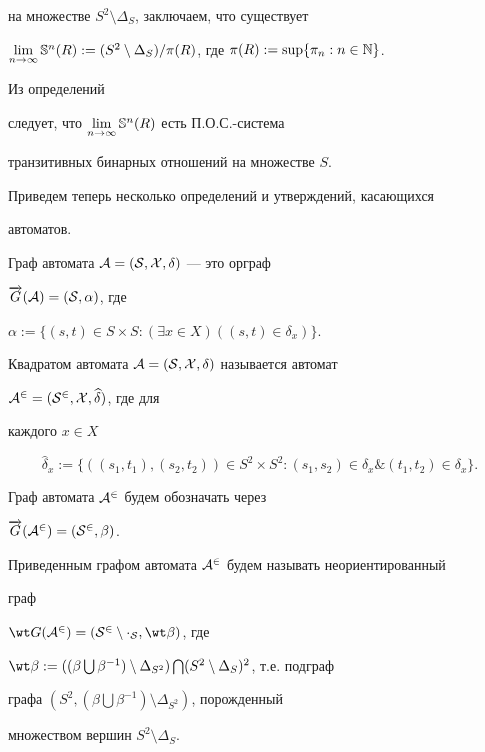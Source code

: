на множестве $S^2\setminus\Delta_S$, заключаем, что существует


$\lim\limits_{n\to\infty}\Bbb S^n(R):=


(S^2\setminus\Delta_S)/\pi(R)$, где $\pi(R):=\sup\{\pi_n:n\in\Bbb N\}$.


Из определений


следует, что $\lim\limits_{n\to\infty}\Bbb S^n(R)$ есть П.О.С.-система


транзитивных бинарных отношений на множестве $S$.





Приведем теперь несколько определений и утверждений, касающихся


автоматов.





Граф автомата $\cal A=(S,X,\delta)$ --- это \cite{Bog} орграф


$\overrightarrow G(\cal A)=(S,\alpha)$, где


$\alpha:=\{(s,t)\in S\times S:(\exists x\in X)((s,t)\in\delta_x)\}$.





Квадратом автомата $\cal A=(S,X,\delta)$ называется автомат


$\cal A^2=(S^2,X,\widehat\delta)$, где для


каждого $x\in X$


$$


\widehat\delta_x:=\{((s_1,t_1),(s_2,t_2))\in S^2\times S^2:


(s_1,s_2)\in\delta_x\&(t_1,t_2)\in\delta_x\}.


$$


Граф автомата $\cal A^2$ будем обозначать через


$\overrightarrow G(\cal A^2)=(S^2,\beta)$.





Приведенным графом автомата $\cal A^2$ будем называть неориентированный


граф


$\wt G(\cal A^2)=(S^2\setminus\Delta_S,\wt\beta)$, где


$\wt\beta:=((\beta\bigcup\beta^{-1})\setminus\Delta_{S^2})


\bigcap(S^2\setminus\Delta_S)^2$, т.е. подграф


графа $(S^2,(\beta\bigcup\beta^{-1})\setminus\Delta_{S^2})$, порожденный


множеством вершин $S^2\setminus\Delta_S$.





